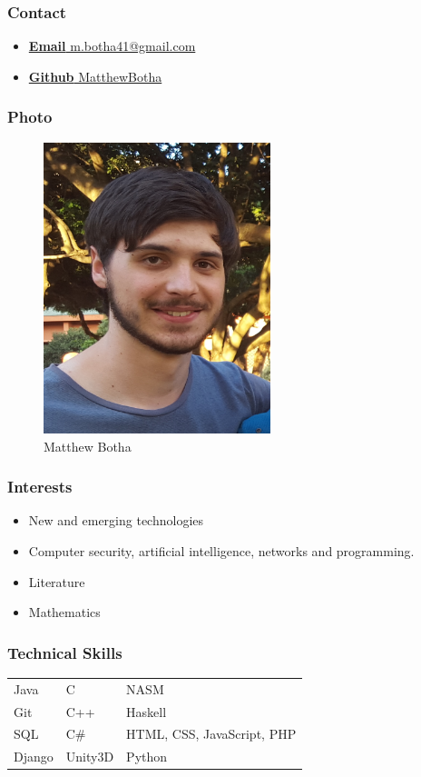 \documentclass{article}
\begin{document}
		\subsubsection{Contact}
			\begin{itemize}
				\item \href{mailto:m.botha41@gmail.com}{\textbf{Email} m.botha41@gmail.com}
				\item \href{https://github.com/MatthewBotha}{\textbf{Github} MatthewBotha}
			\end{itemize}
		\subsubsection{Photo}
		\begin{figure}[H]
			\centering
			\includegraphics[width=250px]{../Matt.jpg}
			\caption{Matthew Botha}
		\end{figure}
		\subsubsection{Interests}
		\begin{itemize}
			\item New and emerging technologies
			\item Computer security, artificial intelligence, networks and programming.
			\item Literature
			\item Mathematics
		\end{itemize}
		
\subsubsection{Technical Skills}
			\begin{tabular}{| l | l | l |}
				Java   & C		& NASM                        \\
				Git    & C++      & Haskell                     \\
				SQL    & C\#	& HTML, CSS, JavaScript, PHP   \\
				Django & Unity3D	& Python	
			\end{tabular}
		
\end{document}
